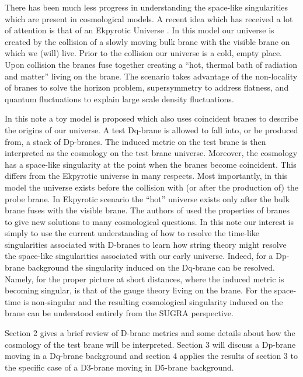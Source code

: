 \documentclass[a4paper,12pt]{article}
\begin{document}
There has been much less progress in understanding the space-like
singularities which are present in cosmological models.  A recent idea
which has received a lot of attention is that of an Ekpyrotic Universe 
\cite{ekpy}.  In this model our universe is created by the
collision of a slowly moving bulk brane with the visible brane on which we
(will) live.   Prior to the collision our universe is a cold, empty
place.  Upon collision the branes fuse together creating a ``hot,
thermal bath of radiation and matter'' living on the brane.  The
scenario takes advantage of the non-locality of branes to solve the
horizon problem, supersymmetry to address flatness, and quantum
fluctuations to explain large scale density fluctuations.

In this note a toy model is proposed which also uses coincident branes
to describe the origins of our universe.  A test Dq-brane is allowed to fall
into, or be produced from, a stack of Dp-branes.  The induced metric
on the test brane is then interpreted as the cosmology on the test brane
universe.  Moreover, the cosmology has a space-like singularity at the
point when the branes become coincident.  This differs from the
Ekpyrotic universe in many respects.  Most importantly, in this model the
universe exists before the collision with (or after the production of)
the probe brane.  In Ekpyrotic scenario the ``hot'' universe 
exists only after the bulk brane fuses with the visible brane.  The authors
of \cite{ekpy} used the properties of branes to give new solutions to
many cosmological questions.  In this note our interest is simply to use the
current understanding of how to resolve the time-like singularities associated
with D-branes to learn how string theory might resolve the space-like 
singularities associated with our early universe.  Indeed,  
for a Dp-brane background the singularity induced on the
Dq-brane can be resolved.  Namely, for \coordHE{} the proper
picture at short distances, where the induced metric is becoming singular,
is that of the gauge theory living on the brane.  For \coordHE{} the
space-time is non-singular and the resulting cosmological singularity
induced on the brane can be understood entirely from the SUGRA perspective.

Section 2 gives a brief review of D-brane metrics and some details
about how the cosmology of the test brane will be interpreted.
Section 3 will discuss a Dp-brane moving in a Dq-brane
background and section 4 applies the results of section 3 to the
specific case of a D3-brane moving in D5-brane background.
\end{document}
